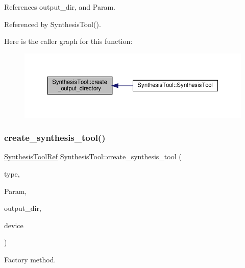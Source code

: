 References output\+\_\+dir, and Param.



Referenced by Synthesis\+Tool().

Here is the caller graph for this function\+:
\nopagebreak
\begin{figure}[H]
\begin{center}
\leavevmode
\includegraphics[width=350pt]{d9/de0/classSynthesisTool_a759edbe8e0ce7d35f563196c4944ae9d_icgraph}
\end{center}
\end{figure}
\mbox{\label{classSynthesisTool_ae066f0740c41bad1b3666abb0672b187}} 
\subsubsection{\texorpdfstring{create\+\_\+synthesis\+\_\+tool()}{create\_synthesis\_tool()}}
{\footnotesize\ttfamily \hyperlink{SynthesisTool_8hpp_af82cb8fc071612a27507a7c212097e58}{Synthesis\+Tool\+Ref} Synthesis\+Tool\+::create\+\_\+synthesis\+\_\+tool (\begin{DoxyParamCaption}\item[{\hyperlink{classSynthesisTool_a8a3b714a93c1e17e715253b5ea2e2647}{type\+\_\+t}}]{type,  }\item[{const \hyperlink{Parameter_8hpp_a37841774a6fcb479b597fdf8955eb4ea}{Parameter\+Const\+Ref} \&}]{Param,  }\item[{const std\+::string \&}]{output\+\_\+dir,  }\item[{const \hyperlink{target__device_8hpp_acedb2b7a617e27e6354a8049fee44eda}{target\+\_\+device\+Ref} \&}]{device }\end{DoxyParamCaption})\hspace{0.3cm}{\ttfamily [static]}}



Factory method. 

